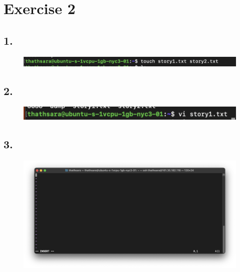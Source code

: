 \documentclass{article}
\begin{document}
    \section*{Exercise 2}

    \subsection*{1.}
    \begin{figure}[H]
        \centering
        \includegraphics[width=\textwidth]{2/1.png}
    \end{figure}

    \subsection*{2.}
    \begin{figure}[H]
        \centering
        \includegraphics[width=\textwidth]{2/2.png}
    \end{figure}

    \subsection*{3.}
    \begin{figure}[H]
        \centering
        \includegraphics[width=\textwidth]{2/3.png}
    \end{figure}
\end{document}
